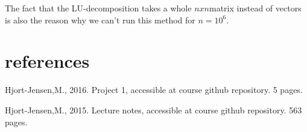 \documentclass[a4paper,norsk,12pt,oneside]{article}
\begin{document}
The fact that the LU-decomposition takes a whole \(n x n\)matrix instead of vectors is also the
reason why we can't run this method for \(n = 10^6\).

\section{references} 
Hjort-Jensen,M., 2016. Project 1, accessible at course github repository. 5 pages. 

Hjort-Jensen,M., 2015. Lecture notes, accessible at course github repository. 563 pages. 
\end{document}
